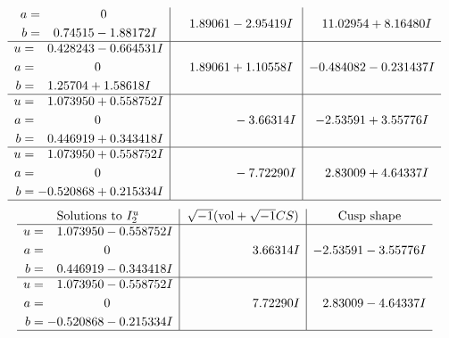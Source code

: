 \documentclass[1p]{elsarticle_modified}
\theoremstyle{definition}
\newcommand{\I}{\sqrt{-1}}
\begin{document}
$$\begin{array}{c|c|c}
\begin{aligned}
a &= \phantom{-0.000000 } 0 \\
b &= \phantom{-}0.74515 - 1.88172 I\end{aligned}
 & \phantom{-}1.89061 - 2.95419 I & \phantom{-}11.02954 + 8.16480 I \\ \hline\begin{aligned}
u &= \phantom{-}0.428243 - 0.664531 I \\
a &= \phantom{-0.000000 } 0 \\
b &= \phantom{-}1.25704 + 1.58618 I\end{aligned}
 & \phantom{-}1.89061 + 1.10558 I & -0.484082 - 0.231437 I \\ \hline\begin{aligned}
u &= \phantom{-}1.073950 + 0.558752 I \\
a &= \phantom{-0.000000 } 0 \\
b &= \phantom{-}0.446919 + 0.343418 I\end{aligned}
 & \phantom{-0.000000 } -3.66314 I & -2.53591 + 3.55776 I \\ \hline\begin{aligned}
u &= \phantom{-}1.073950 + 0.558752 I \\
a &= \phantom{-0.000000 } 0 \\
b &= -0.520868 + 0.215334 I\end{aligned}
 & \phantom{-0.000000 } -7.72290 I & \phantom{-}2.83009 + 4.64337 I\\
 \hline 
 \end{array}$$\newpage$$\begin{array}{c|c|c}  
\text{Solutions to }I^u_{2}& \I (\text{vol} + \sqrt{-1}CS) & \text{Cusp shape}\\
 \hline 
\begin{aligned}
u &= \phantom{-}1.073950 - 0.558752 I \\
a &= \phantom{-0.000000 } 0 \\
b &= \phantom{-}0.446919 - 0.343418 I\end{aligned}
 & \phantom{-0.000000 -}3.66314 I & -2.53591 - 3.55776 I \\ \hline\begin{aligned}
u &= \phantom{-}1.073950 - 0.558752 I \\
a &= \phantom{-0.000000 } 0 \\
b &= -0.520868 - 0.215334 I\end{aligned}
 & \phantom{-0.000000 -}7.72290 I & \phantom{-}2.83009 - 4.64337 I\\
 \hline 
 \end{array}$$\newpage
\end{document}
